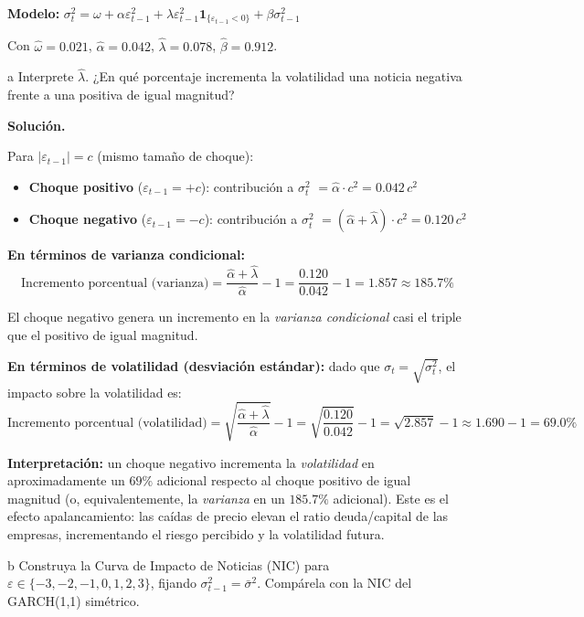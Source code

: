 \documentclass[11pt,a4paper]{article}
\newcommand{\sigmat}{\sigma^2_t}
\newcommand{\sigmabar}{\bar{\sigma}^2}
\newcommand{\eps}{\varepsilon}
\begin{document}
\textbf{Modelo:} $\sigmat = \omega + \alpha\eps_{t-1}^2 + \lambda\eps_{t-1}^2\mathbf{1}_{\{\eps_{t-1}<0\}} + \beta\sigma_{t-1}^2$

Con $\hat{\omega}=0.021$, $\hat{\alpha}=0.042$, $\hat{\lambda}=0.078$, $\hat{\beta}=0.912$.

\begin{cajaInciso}{a}
Interprete $\hat{\lambda}$. ¿En qué porcentaje incrementa la volatilidad una noticia negativa frente a una positiva de igual magnitud?
\end{cajaInciso}

\textbf{Solución.}

Para $|\eps_{t-1}|=c$ (mismo tamaño de choque):
\begin{itemize}[leftmargin=*]
  \item \textbf{Choque positivo} ($\eps_{t-1} = +c$): contribución a $\sigmat$ $= \hat{\alpha}\cdot c^2 = 0.042\,c^2$
  \item \textbf{Choque negativo} ($\eps_{t-1} = -c$): contribución a $\sigmat$ $= (\hat{\alpha}+\hat{\lambda})\cdot c^2 = 0.120\,c^2$
\end{itemize}

\textbf{En términos de varianza condicional:}
\[
\text{Incremento porcentual (varianza)} = \frac{\hat{\alpha}+\hat{\lambda}}{\hat{\alpha}} - 1 = \frac{0.120}{0.042} - 1 = 1.857 \approx 185.7\%
\]

El choque negativo genera un incremento en la \emph{varianza condicional} casi el triple que el positivo de igual magnitud.

\textbf{En términos de volatilidad (desviación estándar):} dado que $\sigma_t = \sqrt{\sigmat}$, el impacto sobre la volatilidad es:
\[
\text{Incremento porcentual (volatilidad)} = \sqrt{\frac{\hat{\alpha}+\hat{\lambda}}{\hat{\alpha}}} - 1 = \sqrt{\frac{0.120}{0.042}} - 1 = \sqrt{2.857} - 1 \approx 1.690 - 1 = 69.0\%
\]

\textbf{Interpretación:} un choque negativo incrementa la \emph{volatilidad} en aproximadamente un $69\%$ adicional respecto al choque positivo de igual magnitud (o, equivalentemente, la \emph{varianza} en un $185.7\%$ adicional). Este es el efecto apalancamiento: las caídas de precio elevan el ratio deuda/capital de las empresas, incrementando el riesgo percibido y la volatilidad futura.

\begin{cajaInciso}{b}
Construya la Curva de Impacto de Noticias (NIC) para $\eps \in \{-3,-2,-1,0,1,2,3\}$, fijando $\sigma^2_{t-1} = \sigmabar$. Compárela con la NIC del GARCH(1,1) simétrico.
\end{cajaInciso}
\end{document}
